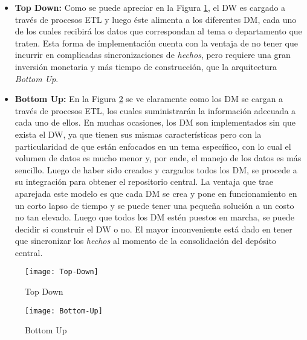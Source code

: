 \documentclass[a4paper,11pt]{article}
\begin{document}
    \begin{itemize}
      \item \textbf{Top Down:} Como se puede apreciar en la Figura \ref{top_down}, el DW es cargado a través de procesos ETL y luego éste alimenta a los
      diferentes DM, cada uno de los cuales recibirá los datos que correspondan al tema o departamento que traten. Esta forma de implementación cuenta
      con la ventaja de no tener que incurrir en complicadas sincronizaciones de \textit{hechos}, pero requiere una gran inversión monetaria y más tiempo de
      construcción, que la arquitectura \textit{Bottom Up}.
      \item \textbf{Bottom Up:} En la Figura \ref{bottom_up} se ve claramente como los DM se cargan a través de procesos ETL, los cuales suministrarán la
      información adecuada a cada uno de ellos. En muchas ocasiones, los DM son implementados sin que exista el DW, ya que tienen sus mismas 
      características pero con la particularidad de que están enfocados en un tema específico, con lo cual el volumen de datos es mucho menor y, por ende,
      el manejo de los datos es más sencillo. Luego de haber sido creados y cargados todos los DM, se procede a su integración para obtener el
     repositorio central. La ventaja que trae aparejada este modelo es que cada DM se crea y pone en funcionamiento en un corto lapso de tiempo y se
      puede tener una pequeña solución a un costo no tan elevado. Luego que todos los DM estén puestos en marcha, se puede decidir si construir el DW o no.
      El mayor inconveniente está dado en tener que sincronizar los \textit{hechos} al momento de la consolidación del depósito central.
    \end{itemize}
    
    \begin{figure}
      \begin{center}
        \texttt{[image: Top-Down]}
        \caption{Top Down} \cite[p.~74]{hefestov2}
        \label{top_down}
      \end{center}
    \end{figure}
    
    \begin{figure}
      \begin{center}
        \texttt{[image: Bottom-Up]}
        \caption{Bottom Up} \cite[p.~74]{hefestov2}
        \label{bottom_up}
      \end{center}
    \end{figure}
    
\end{document}
